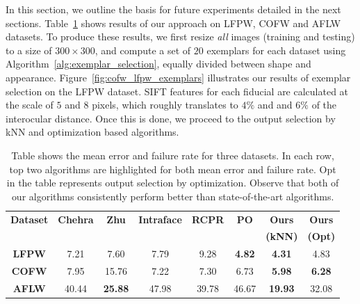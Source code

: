 In this section, we outline the basis for future
experiments detailed in the next sections.
Table~\ref{table:ourBestResults_mean} shows
results of our approach on LFPW, COFW and AFLW datasets. To produce these results, we first
resize \emph{all} images (training and testing) to a size of $300 \times 300$, and 
compute a set of $20$ exemplars for each dataset using Algorithm~\ref{alg:exemplar_selection},
equally divided between shape and appearance. Figure~\ref{fig:cofw_lfpw_exemplars} illustrates our
results of exemplar selection on the LFPW dataset. SIFT features for each fiducial are calculated at
the scale of $5$ and $8$ pixels, which roughly translates to $4\%$ and and $6\%$ of the
interocular distance. Once this is done, we proceed to the output selection by kNN and optimization
based algorithms. 
  
\begin{table}%
   \centering
   \begin{tabular}{c c c c c c c c}
    \toprule[1.5pt]
     {\bf Dataset} &  {\bf Chehra} &  {\bf Zhu} &  {\bf Intraface} &  {\bf RCPR} & {\bf PO} & {\bf Ours} & {\bf Ours} \\
     & & & & & & \bf(kNN) & \bf(Opt) \\
    \midrule
    {\bf LFPW} &  7.21 & 7.60 & 7.79 & 9.28 & {\bf 4.82} & {\bf 4.31 } & 4.83 \\ 
    {\bf COFW} &  7.95 & 15.76 & 7.22 & 7.30 & 6.73 &{\bf 5.98 } & {\bf 6.28} \\
    {\bf AFLW} &  40.44 & {\bf 25.88} & 47.98 & 39.78 & 46.67 & {\bf 19.93} & 32.08 \\ 
    \bottomrule[1.5pt]

    \end{tabular}
    \caption{Table shows the mean error and failure rate for three datasets. In each row, top two algorithms are highlighted for both mean error and failure rate. Opt in the table represents output selection by optimization. Observe that both of our algorithms consistently perform better than state-of-the-art algorithms. }
    \label{table:ourBestResults_mean}
\end{table}

